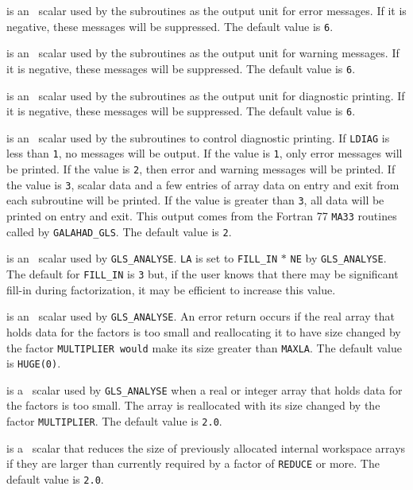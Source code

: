 \documentclass{galahad}
\newcommand{\packagename}{GLS}
\begin{document}
\begin{description}

 is an \integer\ scalar used by the subroutines as the output
 unit for error messages.  If it is negative, these
 messages will be suppressed.  The default value is {\tt 6}.

 is an \integer\ scalar used by the subroutines as the output
 unit for warning messages.  If it is negative, these messages
 will be suppressed.  The default value is {\tt 6}.

 is an \integer\ scalar used by the subroutines as the output
 unit for diagnostic printing.  If it is negative, these messages
 will be suppressed.  The default value is {\tt 6}.

 is an \integer\ scalar used by the subroutines to control
 diagnostic printing.  If {\tt LDIAG} is less than {\tt 1}, no messages will
 be output. If the value is {\tt 1}, only error messages will
 be printed.  If the value is {\tt 2}, then error and warning messages will
 be printed. If the value is {\tt 3}, scalar data and a few
 entries of array data on entry and exit from each subroutine will be
 printed.  If the value is greater than {\tt 3}, all data will be printed on
 entry and exit.  This output comes from the Fortran 77 {\tt MA33} routines
 called by {\tt GALAHAD\_\packagename}. The default value is {\tt 2}.

 is an \integer\ scalar used by {\tt \packagename\_ANALYSE}.
{\tt LA} is set to
{\tt FILL\_IN} $\ast$ {\tt NE} by {\tt \packagename\_ANALYSE}. The default for
{\tt FILL\_IN} is {\tt 3} but, if the user knows that
there may be significant fill-in during factorization, it may be efficient
to increase this value.

 is an \integer\ scalar used by {\tt \packagename\_ANALYSE}. An error
return occurs if the real array that holds data for the factors is too
small and reallocating it to have size changed by the factor {\tt MULTIPLIER
would} make its size greater than {\tt MAXLA}. The default value is
{\tt HUGE(0)}.

 is a \realdp\ scalar used by {\tt \packagename\_ANALYSE} when a
real or integer array that holds data for the factors is too small. The
array is reallocated with its size changed by the factor {\tt MULTIPLIER}.
The default value is {\tt 2.0}.

 is a \realdp\ scalar that reduces the size of previously allocated
internal workspace arrays if they are larger than currently required
by a factor of {\tt REDUCE} or more. The default value is {\tt 2.0}.


\end{description}
\end{document}
